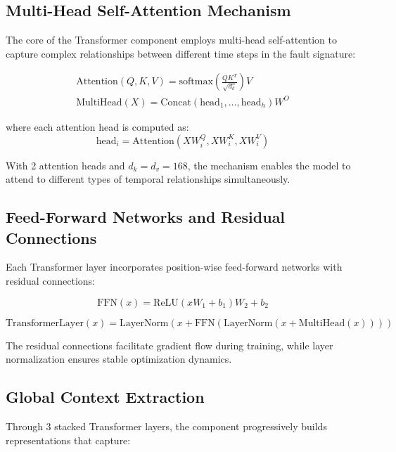 \subsection{Multi-Head Self-Attention Mechanism}
\label{subsec:self_attention}

The core of the Transformer component employs multi-head self-attention to capture complex relationships between different time steps in the fault signature:

\begin{align}
\text{Attention}(Q, K, V) = \text{softmax}\left(\frac{QK^T}{\sqrt{d_k}}\right)V \\
\text{MultiHead}(X) = \text{Concat}(\text{head}_1, \ldots, \text{head}_h)W^O
\end{align}

where each attention head is computed as:
\begin{equation}
\text{head}_i = \text{Attention}(XW_i^Q, XW_i^K, XW_i^V)
\end{equation}

With 2 attention heads and $d_k = d_v = 168$, the mechanism enables the model to attend to different types of temporal relationships simultaneously.

\subsection{Feed-Forward Networks and Residual Connections}
\label{subsec:ffn_residual}

Each Transformer layer incorporates position-wise feed-forward networks with residual connections:

\begin{equation}
\text{FFN}(x) = \text{ReLU}(xW_1 + b_1)W_2 + b_2
\end{equation}

\begin{equation}
\text{TransformerLayer}(x) = \text{LayerNorm}(x + \text{FFN}(\text{LayerNorm}(x + \text{MultiHead}(x))))
\end{equation}

The residual connections facilitate gradient flow during training, while layer normalization ensures stable optimization dynamics.

\subsection{Global Context Extraction}
\label{subsec:global_context}

Through 3 stacked Transformer layers, the component progressively builds representations that capture:

